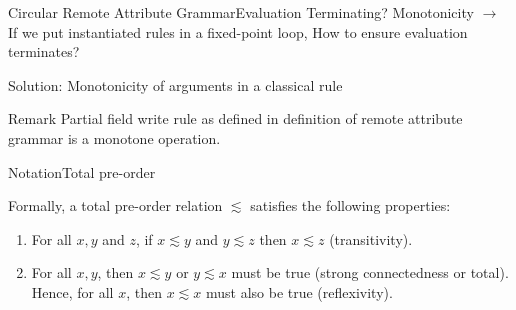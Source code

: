 


\begin{frame}{Circular Remote Attribute Grammar}{Evaluation Terminating? Monotonicity}
$\to$ If we put instantiated rules in a fixed-point loop, How to \alert{ensure evaluation terminates}?

\newlinevspace

Solution: \alert{Monotonicity} of arguments in a classical rule

\newlinevspace

\begin{block}{Remark}
Partial field write rule as defined in definition of remote attribute grammar \alert{is a monotone operation}.
\end{block}
\end{frame}




\begin{frame}{Notation}{Total pre-order}

Formally, a total pre-order relation $\lesssim$ satisfies the following properties:

\begin{enumerate}
    \item For all $x,y$ and $z$, if $x\lesssim y$ and $y\lesssim z$ then $x\lesssim z$ (\alert{transitivity}).
    \item For all $x, y$, then $x\lesssim y$ or $y\lesssim x$ must be true (strong connectedness or \alert{total}). Hence, for all $x$, then $x\lesssim x$ must also be true (\alert{reflexivity}).
\end{enumerate}    

\end{frame}




